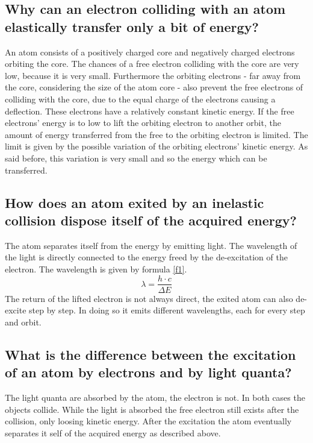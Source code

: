 \documentclass[a4paper,11pt,twoside]{article}
\begin{document}
\subsection{Why can an electron colliding with an atom elastically transfer only a bit of energy?}
An atom consists of a positively charged core and negatively charged electrons orbiting the core. The chances of a free electron colliding with the core are very low, because it is very small. Furthermore the orbiting electrons - far away from the core, considering the size of the atom core - also prevent the free electrons of colliding with the core, due to the equal charge of the electrons causing a deflection. These electrons have a relatively constant kinetic energy. If the free electrons' energy is to low to lift the orbiting electron to another orbit, the amount of energy transferred from the free to the orbiting electron is limited. The limit is given by the possible variation of the orbiting electrons' kinetic energy. As said before, this variation is very small and so the energy which can be transferred.

\subsection{How does an atom exited by an inelastic collision dispose itself of the acquired energy?}
The atom separates itself from the energy by emitting light. The wavelength of the light is directly connected to the energy freed by the de-excitation of the electron. The wavelength is given by formula \ref{f1}.
%
\begin{equation}
    \label{f1}
        \lambda = \frac{h \cdot c}{\Delta E}
\end{equation} 
%
The return of the lifted electron is not always direct, the exited atom can also de-excite step by step. In doing so it emits different wavelengths, each for every step and orbit.

\subsection{What is the difference between the excitation of an atom by electrons and by light quanta?}
The light quanta are absorbed by the atom, the electron is not. In both cases the objects collide. While the light is absorbed the free electron still exists after the collision, only loosing kinetic energy. After the excitation the atom eventually separates it self of the acquired energy as described above.  
\end{document}
